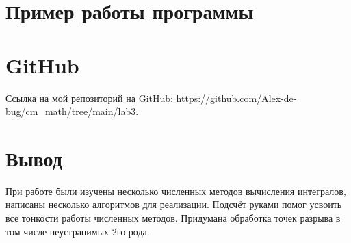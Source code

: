 \documentclass{article}
\begin{document}
 
\section{Пример работы программы}


\section{GitHub}
Ссылка на мой репозиторий на GitHub: \url{https://github.com/Alex-de-bug/cm_math/tree/main/lab3}.

\section{Вывод}
При работе были изучены несколько численных методов вычисления интегралов, написаны несколько алгоритмов для реализации. Подсчёт руками помог усвоить все тонкости работы численных методов. Придумана обработка точек разрыва в том числе неустранимых 2го рода.
\end{document}
